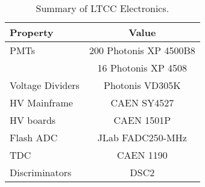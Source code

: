 \begin{table}[h]
	\begin{center}
		\begin{tabular}{| l | c |}
			\hline \hline
			Property                 & Value \\
			\hline
			PMTs             & 200 Photonis XP 4500B8    \\
	                         & 16 Photonis XP 4508       \\
			Voltage Dividers & Photonis VD305K           \\
			HV Mainframe     & CAEN SY4527               \\
			HV boards        & CAEN 1501P                     \\
			Flash ADC        & JLab FADC250-MHz\cite{daq2019} \\
			TDC              & CAEN 1190                 \\
			Discriminators   & DSC2\cite{daq2019}        \\
			\hline \hline
		\end{tabular}
	\end{center}
	\caption{Summary of LTCC Electronics.}\label{tab:ltccChannels}
\end{table}

